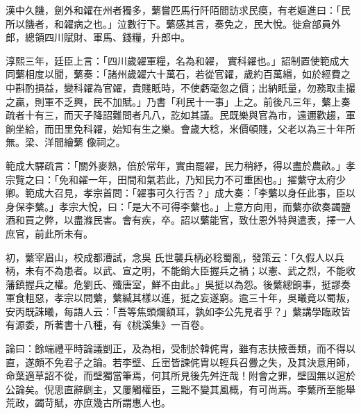 \begin{pinyinscope}
 漢中久饑，劍外和糴在州者獨多，蘩嘗匹馬行阡陌間訪求民瘼，有老嫗進曰：「民所以饑者，和糴病之也。」泣數行下。蘩感其言，奏免之，民大悅。徙倉部員外郎，總領四川賦財、軍馬、錢糧，升郎中。



 淳熙三年，廷臣上言：「四川歲糴軍糧，名為和糴，
 實科糴也。」詔制置使範成大同蘩相度以聞，蘩奏：「諸州歲糴六十萬石，若從官糴，歲約百萬緡，如於經費之中斟酌損益，變科糴為官糴，貴賤眂時，不使虧毫忽之價；出納眂量，勿務取圭撮之贏，則軍不乏興，民不加賦。」乃書「利民十一事」上之。前後凡三年，蘩上奏疏者十有三，而天子降詔難問者凡八，訖如其議。民既樂與官為市，遠邇歡趨，軍餉坐給，而田里免科糴，始知有生之樂。會歲大稔，米價頓賤，父老以為三十年所無。梁、洋間繪蘩
 像祠之。



 範成大驛疏言：「關外麥熟，倍於常年，實由罷糴，民力稍紓，得以盡於農畝。」孝宗覽之曰：「免和糴一年，田間和氣若此，乃知民力不可重困也。」擢蘩守太府少卿。範成大召見，孝宗首問：「糴事可久行否？」成大奏：「李蘩以身任此事，臣以身保李蘩。」孝宗大悅，曰：「是大不可得李蘩也。」上意方向用，而蘩亦欲奏蠲鹽酒和買之弊，以盡滌民害。會有疾，卒。詔以蘩能官，致仕恩外特與遣表，擇一人庶官，前此所未有。



 初，蘩宰眉山，校成都漕試，念吳
 氏世襲兵柄必稔蜀亂，發策云：「久假人以兵柄，未有不為患者。以武、宣之明，不能銷大臣握兵之禍；以憲、武之烈，不能收藩鎮握兵之權。危劉氏、殲唐室，鮮不由此。」吳挺以為怨。後蘩總餉事，挺謬奏軍食粗惡，孝宗以問蘩，蘩緘其樣以進，挺之妄遂窮。逾三十年，吳曦竟以蜀叛，安丙既誅曦，每語人云：「吾等焦頭爛額耳，孰如李公先見者乎？」蘩講學臨政皆有源委，所著書十八種，有《桃溪集》一百卷。



 論曰：餘端禮平時論議剴正，及為相，受制於韓侂胄，雖有志扶掖善類，而不得以直，遂頗不免君子之論。若李壁、丘崈皆諫侂胄以輕兵召釁之失，及其決意用師，命葉適草詔不從，而壁獨當筆焉，何其所見後先舛迕哉！附會之罪，壁固無以逭於公論矣。倪思直辭劘主，又屢觸權臣，三黜不變其風概，有可尚焉。李蘩所至能舉荒政，蠲苛賦，亦庶幾古所謂惠人也。



\end{pinyinscope}